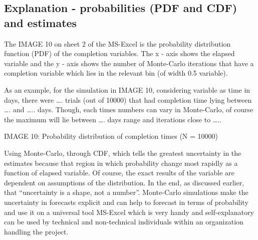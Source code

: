 \subsection{Explanation - probabilities (PDF and CDF) and estimates}

The IMAGE 10 on sheet 2 of the MS-Excel is the probability distribution function (PDF) of the completion variables. The x - axis shows the elapsed variable and the y - axis shows the number of Monte-Carlo iterations that have a completion variable which lies in the relevant bin (of width 0.5 variable).


As an example, for the simulation in IMAGE 10, considering variable as time in days, there were …. trials (out of 10000) that had completion time lying between …. and ….. days. Though, each times numbers can vary in Monte-Carlo, of course the maximum will lie between …. days range and iterations close to …..

IMAGE 10: Probability distribution of completion times (N = 10000)

Using Monte-Carlo, through CDF, which tells the greatest uncertainty in the estimates because that region in which probability change most rapidly as a function of elapsed variable. Of course, the exact results of the variable are dependent on assumptions of the distribution. In the end, as discussed earlier, that “uncertainty is a shape, not a number”. Monte-Carlo simulations make the uncertainty in forecasts explicit and can help to forecast in terms of probability and use it on a universal tool MS-Excel which is very handy and self-explanatory can be used by technical and non-technical individuals within an organization handling the project.


